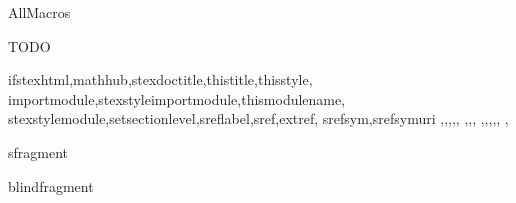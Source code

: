 \documentclass{stex}
\begin{document}
  \begin{smodule}{AllMacros}

  \begin{sfragment}{TODO}

    \begin{sfunction}{
      ifstexhtml,mathhub,stexdoctitle,thistitle,thisstyle,
      importmodule,stexstyleimportmodule,thismodulename,
      stexstylemodule,setsectionlevel,sreflabel,sref,extref,
      srefsym,srefsymuri
    }{\ifstexhtml,\mathhub,\stexdoctitle,\thistitle,\thisstyle,
    \importmodule,\stexstyleimportmodule,\thismodulename,
    \stexstylemodule,\setsectionlevel,\sreflabel,\sref,\extref,
    \srefsym,\srefsymuri
    }
    \end{sfunction}

    \begin{senv}{sfragment}\end{senv}
    \begin{senv}{blindfragment}\end{senv}

  \end{sfragment}
  \end{smodule}
\end{document}
